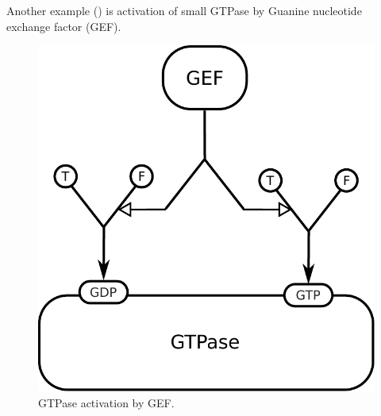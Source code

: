 Another example () is activation of small GTPase by Guanine nucleotide exchange factor (GEF).

\begin{figure}[H]
  \centering
  \includegraphics[scale = 0.75]{examples/gef}
  \caption{GTPase activation by GEF.}
  \label{fig:gef}
\end{figure}
